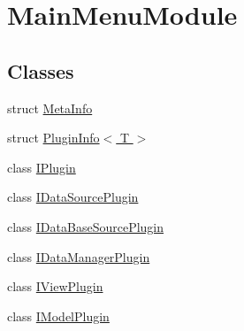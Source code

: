 \hypertarget{group___main_menu_module}{}\section{Main\+Menu\+Module}
\label{group___main_menu_module}
\subsection*{Classes}
\begin{DoxyCompactItemize}
\item 
struct \hyperlink{struct_meta_info}{Meta\+Info}
\item 
struct \hyperlink{struct_plugin_info}{Plugin\+Info$<$ T $>$}
\item 
class \hyperlink{class_i_plugin}{I\+Plugin}
\item 
class \hyperlink{class_i_data_source_plugin}{I\+Data\+Source\+Plugin}
\item 
class \hyperlink{class_i_data_base_source_plugin}{I\+Data\+Base\+Source\+Plugin}
\item 
class \hyperlink{class_i_data_manager_plugin}{I\+Data\+Manager\+Plugin}
\item 
class \hyperlink{class_i_view_plugin}{I\+View\+Plugin}
\item 
class \hyperlink{class_i_model_plugin}{I\+Model\+Plugin}
\end{DoxyCompactItemize}
